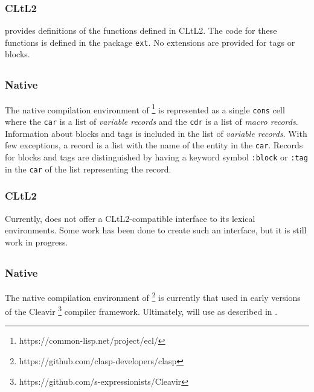\subsubsection{CLtL2}

\cmucl{} provides definitions of the functions defined in CLtL2.  The
code for these functions is defined in the package \texttt{ext}.  No
extensions are provided for tags or blocks.

\subsection{\ecl{}}

\subsubsection{Native}

The native compilation environment of \ecl{}%
\footnote{https://common-lisp.net/project/ecl/}
is represented as a single \texttt{cons} cell where the \texttt{car}
is a list of \emph{variable records} and the \texttt{cdr} is a list of
\emph{macro records}.  Information about blocks and tags is included
in the list of \emph{variable records}.  With few exceptions, a record
is a list with the name of the entity in the \texttt{car}.  Records
for blocks and tags are distinguished by having a keyword symbol
\texttt{:block} or \texttt{:tag} in the \texttt{car} of the list
representing the record.

\subsubsection{CLtL2}

Currently, \ecl{} does not offer a CLtL2-compatible interface to its
lexical environments.  Some work has been done to create such an
interface, but it is still work in progress.

\subsection{\clasp{}}

\subsubsection{Native}

The native compilation environment of \clasp{}%
\footnote{https://github.com/clasp-developers/clasp}
is currently that used in early versions of the Cleavir%
\footnote{https://github.com/s-expressionists/Cleavir}
compiler framework.  Ultimately,
\clasp{} will use \trucler{} as described in .

